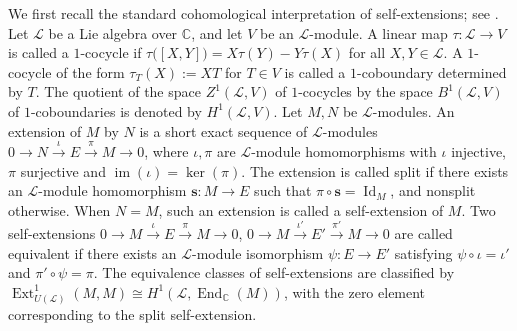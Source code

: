 \documentclass[12pt,reqno]{amsart}
\def\C{\mathbb{C}}
\numberwithin{equation}{section}
\begin{document}
 
We first recall the standard
cohomological interpretation of self-extensions; see
\cite{ChevalleyEilenberg,Fuks,Weibel}. 
    Let $\mathcal{L}$ be a Lie algebra over $\C$, and let $V$ be an $\mathcal{L}$-module. A linear map $\tau:\mathcal{L}\to V$ is called a $1$-cocycle 
    if 
    $\tau\big([X,Y]\big)=X\tau(Y)-Y\tau(X)$
    for all $X,Y\in \mathcal{L}$. A $1$-cocycle of the form $\tau_{T}(X):=XT$ for $T\in V$ is called a $1$-coboundary determined by $T$. The quotient of the space $Z^1(\mathcal{L},V)$ of $1$-cocycles by the space $B^1(\mathcal{L},V)$ of $1$-coboundaries is denoted by $H^1(\mathcal{L},V)$.
    Let $M,N$ be $\mathcal{L}$-modules. An extension of $M$ by $N$ is a short exact sequence of $\mathcal{L}$-modules
$0\longrightarrow N\xrightarrow{\iota} E
\xrightarrow{\pi}M\longrightarrow0$, where $\iota,\pi$ are  $\mathcal{L}$-module homomorphisms with $\iota$ injective, $\pi$ surjective and $\operatorname{im} (\iota)=\ker (\pi)$. The extension is called split if there exists an $\mathcal{L}$-module homomorphism $\mathbf{s}:M\to E$ such that $\pi\circ\mathbf{s}=\operatorname{Id}_{M}$, and nonsplit otherwise. When $N=M$, such an extension is called a self-extension of $M$. Two self-extensions $0\longrightarrow M\xrightarrow{\iota} E
\xrightarrow{\pi}M\longrightarrow0$, $0\longrightarrow M\xrightarrow{\iota'} E'
\xrightarrow{\pi'}M\longrightarrow0$ are called equivalent if there exists an $\mathcal{L}$-module isomorphism $\psi:E\to E'$ satisfying $\psi\circ \iota=\iota'$ and $\pi'\circ\psi=\pi$. The equivalence classes of self-extensions are classified by $\operatorname{Ext}^1_{U(\mathcal{L})}(M,M)\cong H^1(\mathcal{L},\operatorname{End}_{\mathbb C}(M))$, with the zero element corresponding to the split self-extension.
    
\end{document}
